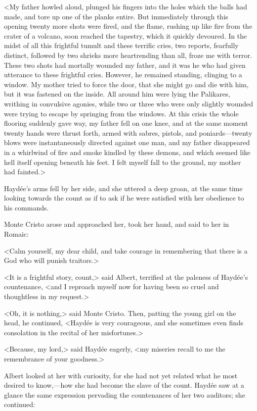  <My father howled aloud, plunged his fingers into the holes which the balls had made, and tore up one of the planks entire. But immediately through this opening twenty more shots were fired, and the flame, rushing up like fire from the crater of a volcano, soon reached the tapestry, which it quickly devoured. In the midst of all this frightful tumult and these terrific cries, two reports, fearfully distinct, followed by two shrieks more heartrending than all, froze me with terror. These two shots had mortally wounded my father, and it was he who had given utterance to these frightful cries. However, he remained standing, clinging to a window. My mother tried to force the door, that she might go and die with him, but it was fastened on the inside. All around him were lying the Palikares, writhing in convulsive agonies, while two or three who were only slightly wounded were trying to escape by springing from the windows. At this crisis the whole flooring suddenly gave way, my father fell on one knee, and at the same moment twenty hands were thrust forth, armed with sabres, pistols, and poniards—twenty blows were instantaneously directed against one man, and my father disappeared in a whirlwind of fire and smoke kindled by these demons, and which seemed like hell itself opening beneath his feet. I felt myself fall to the ground, my mother had fainted.> 

 Haydée's arms fell by her side, and she uttered a deep groan, at the same time looking towards the count as if to ask if he were satisfied with her obedience to his commands. 

 Monte Cristo arose and approached her, took her hand, and said to her in Romaic: 

 <Calm yourself, my dear child, and take courage in remembering that there is a God who will punish traitors.> 

 <It is a frightful story, count,> said Albert, terrified at the paleness of Haydée's countenance, <and I reproach myself now for having been so cruel and thoughtless in my request.> 

 <Oh, it is nothing,> said Monte Cristo. Then, patting the young girl on the head, he continued, <Haydée is very courageous, and she sometimes even finds consolation in the recital of her misfortunes.> 

 <Because, my lord,> said Haydée eagerly, <my miseries recall to me the remembrance of your goodness.> 

 Albert looked at her with curiosity, for she had not yet related what he most desired to know,—how she had become the slave of the count. Haydée saw at a glance the same expression pervading the countenances of her two auditors; she continued: 

